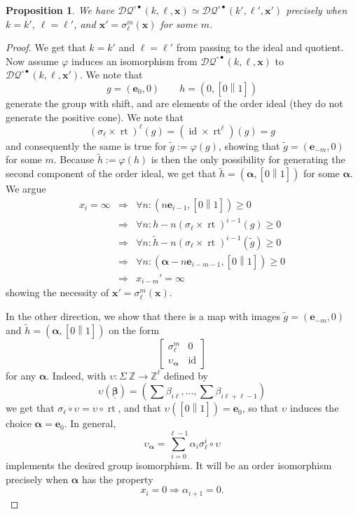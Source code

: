 \documentclass[12pt]{amsbook}%
\newcommand{\rt}{\operatorname{rt}}
\newcommand{\ee}{{\mathbf e}}
\renewcommand{\phi}{\varphi}
\newtheorem{propo}[theor]{Proposition}
\theoremstyle{defin}
\theoremstyle{remark}
\numberwithin{equation}{chapter}
\numberwithin{theor}{section}
\newcommand{\ZZ}{\mathbb{Z}}
\newcommand{\DQ}{\mathcal{DQ}}
\newcommand{\id}{\operatorname{id}}
\newcommand{\SRi}{{\circ\bullet}}
\newcommand{\nsX}{\Sigma\ }
\newcommand{\oXe}[2]{\left[#1\left\|{#2}\right.\right]}
\newcommand{\xx}{\mathbf{x}}
\newcommand{\alal}{\pmb{\alpha}}
\newcommand{\bebebe}{\underline{\pmb{\beta}}}
\begin{document}
\begin{propo}\label{SRisostable}
We have $\DQ^\SRi(k,\ell,\xx)\simeq \DQ^\SRi(k',\ell',\xx')$ precisely when $k=k'$, $\ell=\ell'$, and $\xx'=\sigma_\ell^m(\xx)$ for some $m$.
\end{propo}
\begin{proof}
We get that $k=k'$ and $\ell=\ell'$ from passing to the ideal and quotient.  Now assume $\phi$ induces an isomorphism from $\DQ^\SRi(k,\ell,\xx)$ to $\DQ^\SRi(k,\ell,\xx')$. We note that
\[
g=(\ee_0,0)\qquad h=(0,\oXe 01)
\]
generate the group with shift, and are elements of the order ideal  (they do not generate the positive cone). We note that
\[
(\sigma_\ell\times \rt)^\ell(g)=(\id\times\rt^\ell)(g)=g
\]
and consequently the same is true for $\widetilde g:=\phi(g)$, showing that $\widetilde g=(\ee_{-m},0)$ for some $m$. Because  $\widetilde h:=\phi(h)$ is then the only possibility for generating the second component of the order ideal, we get that $\widetilde h=(\alal,\oXe 01)$ for some $\alal$. We argue 
\begin{eqnarray*}
x_i=\infty&\Longrightarrow &\forall n: (n\ee_{i-1},\oXe 01)\geq 0\\
&\Longrightarrow &\forall n: h-n(\sigma_\ell\times \rt)^{i-1}(g)\geq 0\\
&\Longrightarrow &\forall n: \widetilde{h}-n(\sigma_\ell\times \rt)^{i-1}(\widetilde{g})\geq 0\\
&\Longrightarrow &\forall n: (\alal-n\ee_{i-m-1},\oXe 01)\geq 0\\
&\Longrightarrow &x_{i-m}'=\infty
\end{eqnarray*}
showing the necessity of $\xx'=\sigma_\ell^m(\xx)$.

In the other direction, we show that there is a map with images  $\widetilde g=(\ee_{-m},0)$  and $\widetilde h=(\alal,\oXe 01)$ on the form
\[
\begin{bmatrix}
\sigma_\ell^m&0\\
\upsilon_{\alal}&\id
\end{bmatrix}
\]
for any  $\alal$. Indeed, with $\upsilon: \nsX\ZZ\to\ZZ^\ell$ defined by
\begin{equation}\label{SRformi}
\upsilon(\bebebe)=(\textstyle \sum \beta_{i\ell},\dots,\sum\beta_{i\ell+\ell-1})
\end{equation}
we get that $\sigma_\ell\circ \upsilon=\upsilon\circ\rt$, and that $\upsilon(\oXe 01)=\ee_0$, so that $\upsilon$ induces the choice $\alal=\ee_0$. In general,
\begin{equation}\label{SRformii}
\upsilon_{\alal}=\sum_{i=0}^{\ell-1} \alpha_i\sigma_\ell^i\circ \upsilon
\end{equation}
implements the desired group isomorphism. It will be an order isomorphism precisely when $\alal$ has the property
\[
x_i=0\Longrightarrow \alpha_{i+1}=0.
\]
\end{proof}
\end{document}
